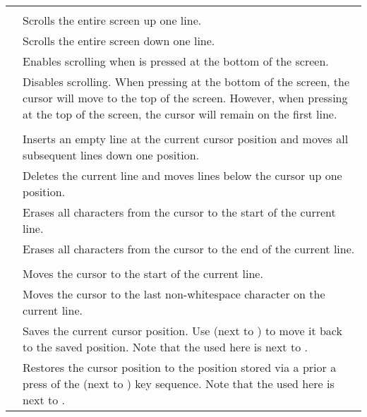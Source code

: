 \begin{center}
\begin{longtable}{c|L{5.5cm}}
  \hhline{==}
   \\
  \hhline{==}
  &
Scrolls the entire screen up one line.\\
\hline
{}  &
Scrolls the entire screen down one line.\\
\hline
{}  &
Enables scrolling when \megakey{$\downarrow$} is pressed at the bottom of the screen.\\
\hline
{}  &
Disables scrolling. When pressing \megakey{$\downarrow$} at the bottom of the screen, the cursor will move to the top of the
screen. However, when pressing \megakey{$\uparrow$} at the top of the screen, the cursor will remain on the first line.\\
  \hhline{==}
   \\
  \hhline{==}
  &
Inserts an empty line at the current cursor position and moves all subsequent lines down one position.\\
\hline
{}  &
Deletes the current line and moves lines below the cursor up one position.\\
\hline
{}  &
Erases all characters from the cursor to the start of the current line.\\
\hline
{}  &
Erases all characters from the cursor to the end of the current line.\\
  \hhline{==}
   \\
  \hhline{==}
  &
Moves the cursor to the start of the current line.\\
\hline
{}  &
Moves the cursor to the last non-whitespace character on the current line.\\
\hline
{} \megakey{$\uparrow$} &
Saves the current cursor position. Use  \megakey{$\leftarrow$} (next to ) to move it back
to the saved position. Note that the \megakey{$\uparrow$} used here is next to .\\
\hline
{} \megakey{$\leftarrow$} &
Restores the cursor position to the position stored via a prior a press of the  \megakey{$\uparrow$}
(next to ) key sequence. Note that the \megakey{$\leftarrow$} used here is next to .\\


\end{longtable}
\end{center}

